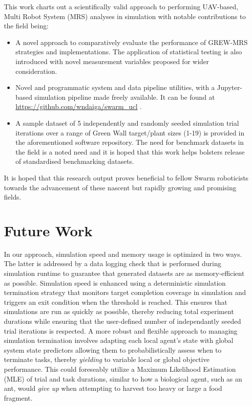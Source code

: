\documentclass{report}
\begin{document}
This work charts out a scientifically valid approach to performing UAV-based, Multi Robot System (MRS) analyses in simulation with notable contributions to the field being:

\begin{itemize}
	\item A novel approach to comparatively evaluate the performance of GREW-MRS strategies and implementations. The application of statistical testing is also introduced with novel measurement variables proposed for wider consideration.
	\item Novel and programmatic system and data pipeline utilities, with a Jupyter-based \cite{Jupyter} simulation pipeline made freely available. It can be found at \url{https://github.com/wndaiga/swarm_ucl} \cite{SWARMCODE}.
	\item A sample dataset of 5 independently and randomly seeded simulation trial iterations over a range of Green Wall target/plant sizes (1-19) is provided in the aforementioned software repository. The need for benchmark datasets in the field is a noted need and it is hoped that this work helps bolsters release of standardised benchmarking datasets.
\end{itemize}

It is hoped that this research output proves beneficial to fellow Swarm roboticists towards the advancement of these nascent but rapidly growing and promising fields.

\section{Future Work}
In our approach, simulation speed and memory usage is optimized in two ways. The latter is addressed by a data logging check that is performed during simulation runtime to guarantee that generated datasets are as memory-efficient as possible. Simulation speed is enhanced using a deterministic simulation termination strategy that monitors target completion coverage in simulation and triggers an exit condition when the threshold is reached. This ensures that simulations are run as quickly as possible, thereby reducing total experiment durations while ensuring that the user-defined number of independantly seeded trial iterations is respected. A more robust and flexible approach to managing simulation termination involves adapting each local agent's state with global system state predictors allowing them to probabilistically assess when to terminate tasks, thereby \textit{yielding} to variable local or global objective performance. This could foreseably utilize a Maximum Likelihood Estimation (MLE) of trial and task durations, similar to how a biological agent, such as an ant, would \textit{give up} when attempting to harvest too heavy or large a food fragment.
\end{document}
